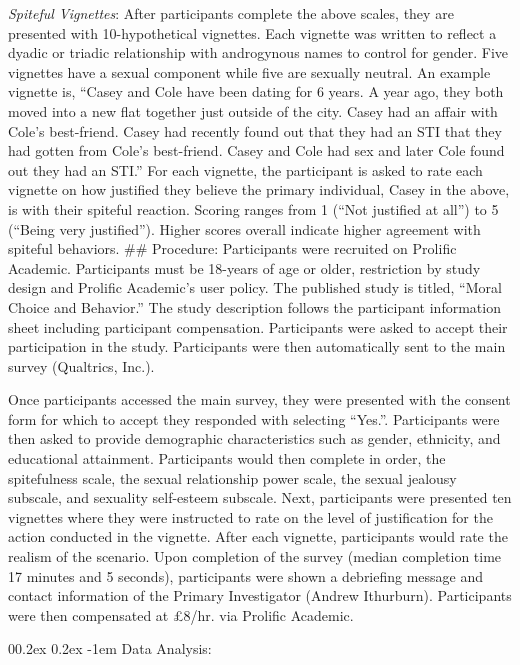 \documentclass[
  english,
  donotrepeattitle,doc, 12pt, a4paper,floatsintext]{apa7}
\makeatletter
\let\oldparagraph\paragraph
\renewcommand{\paragraph}[1]{\oldparagraph{#1}\mbox{}}
\renewcommand{\paragraph}{\@startsection{paragraph}{4}{\parindent}%
  {0\baselineskip \@plus 0.2ex \@minus 0.2ex}%
  {-1em}%
  {\normalfont\normalsize\bfseries\itshape\typesectitle}}
\makeatother
\begin{document}
\emph{Spiteful Vignettes}: After participants complete the above scales, they are presented with 10-hypothetical vignettes. Each vignette was written to reflect a dyadic or triadic relationship with androgynous names to control for gender. Five vignettes have a sexual component while five are sexually neutral. An example vignette is,
``Casey and Cole have been dating for 6 years. A year ago, they both moved into a new flat together just outside of the city. Casey had an affair with Cole's best-friend. Casey had recently found out that they had an STI that they had gotten from Cole's best-friend. Casey and Cole had sex and later Cole found out they had an STI.''
For each vignette, the participant is asked to rate each vignette on how justified they believe the primary individual, Casey in the above, is with their spiteful reaction. Scoring ranges from 1 (``Not justified at all'') to 5 (``Being very justified''). Higher scores overall indicate higher agreement with spiteful behaviors.
\#\# Procedure:
Participants were recruited on Prolific Academic. Participants must be 18-years of age or older, restriction by study design and Prolific Academic's user policy. The published study is titled, ``Moral Choice and Behavior.'' The study description follows the participant information sheet including participant compensation. Participants were asked to accept their participation in the study. Participants were then automatically sent to the main survey (Qualtrics, Inc.).

Once participants accessed the main survey, they were presented with the consent form for which to accept they responded with selecting ``Yes.''. Participants were then asked to provide demographic characteristics such as gender, ethnicity, and educational attainment. Participants would then complete in order, the spitefulness scale, the sexual relationship power scale, the sexual jealousy subscale, and sexuality self-esteem subscale. Next, participants were presented ten vignettes where they were instructed to rate on the level of justification for the action conducted in the vignette. After each vignette, participants would rate the realism of the scenario. Upon completion of the survey (median completion time 17 minutes and 5 seconds), participants were shown a debriefing message and contact information of the Primary Investigator (Andrew Ithurburn). Participants were then compensated at £8/hr. via Prolific Academic.

\hypertarget{data-analysis}{%
\paragraph{Data Analysis:}\label{data-analysis}}
\end{document}
